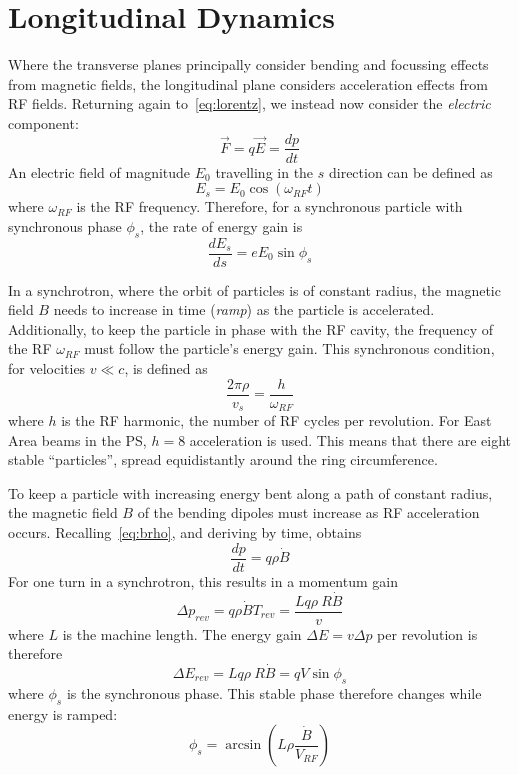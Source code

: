 \documentclass[11pt]{report}
\begin{document}
\section{Longitudinal Dynamics}\label{sec:long}

Where the transverse planes principally consider bending and focussing effects from magnetic fields, the longitudinal plane considers acceleration effects from RF fields. Returning again to~\autoref{eq:lorentz}, we instead now consider the \textit{electric} component:
\begin{equation}
  \vec F = q\vec E = \frac{dp}{dt}
\end{equation} 
An electric field of magnitude $E_0$ travelling in the $s$ direction can be defined as
\begin{equation}
  E_s = E_0\cos(\omega_{RF}t)
\end{equation} where $\omega_{RF}$ is the RF frequency. Therefore, for a synchronous particle with synchronous phase $\phi_s$, the rate of energy gain is
\begin{equation}
  \frac{dE_s}{ds}=eE_0\sin\phi_s
\end{equation}

In a synchrotron, where the orbit of particles is of constant radius, the magnetic field $B$ needs to increase in time (\textit{ramp}) as the particle is accelerated. Additionally, to keep the particle in phase with the RF cavity, the frequency of the RF $\omega_{RF}$ must follow the particle's energy gain. This synchronous condition, for velocities $v\ll c$, is defined as
\begin{equation}
  \frac{2\pi\rho}{v_s}=\frac h{\omega_{RF}}
\end{equation} where $h$ is the RF harmonic, the number of RF cycles per revolution. For East Area beams in the PS, $h=8$ acceleration is used. This means that there are eight stable ``particles'', spread equidistantly around the ring circumference. 

To keep a particle with increasing energy bent along a path of constant radius, the magnetic field $B$ of the bending dipoles must increase as RF acceleration occurs. Recalling~\autoref{eq:brho}, and deriving by time, obtains
\begin{equation}
  \frac{dp}{dt} = q\rho\dot B
\end{equation}
For one turn in a synchrotron, this results in a momentum gain
\begin{equation}
  \Delta p_{rev} = q\rho\dot B T_{rev}=\frac{Lq\rho~R\dot B}v
\end{equation} where $L$ is the machine length. 
The energy gain $\Delta E=v\Delta p$ per revolution is therefore
\begin{equation}
  \Delta E_{rev} = Lq\rho~R\dot B=qV\sin \phi_s
  \label{eq:ef_sin}
\end{equation} where $\phi_s$ is the synchronous phase. This stable phase therefore changes while energy is ramped:
\begin{equation}
  \phi_s=\arcsin\left(L\rho\frac{\dot B}{V_{RF}}\right)
  \label{eq:sync_phase}
\end{equation}
\end{document}
